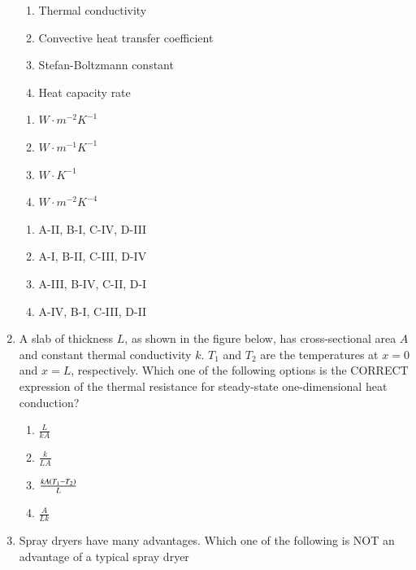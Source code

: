 \documentclass[journal,12pt,onecolumn]{IEEEtran}
\theoremstyle{remark}
\begin{document}
\begin{enumerate}
\hfill{}
\begin{multicols}{2}
    \begin{enumerate}[label = \Alph*]
        \item Thermal conductivity
        \item Convective heat transfer coefficient 
        \item Stefan-Boltzmann constant 
        \item Heat capacity rate 
    \end{enumerate}

\columnbreak

\begin{enumerate}[label = \Roman*]
    \item $W\cdot m^{-2}K^{-1}$
    \item $W\cdot m^{-1}K^{-1}$
    \item $W\cdot K^{-1}$
    \item $W\cdot m^{-2}K^{-4}$
\end{enumerate}
\end{multicols}

\begin{enumerate}
    \item A-II, B-I, C-IV, D-III
    \item A-I, B-II, C-III, D-IV
    \item A-III, B-IV, C-II, D-I
    \item A-IV, B-I, C-III, D-II
\end{enumerate}

    \item A slab of thickness $L$, as shown in the figure below, has cross-sectional area $A$ and constant thermal conductivity $k$. $T_1$ and $T_2$ are the temperatures at $x = 0$ and $x = L$, respectively. Which one of the following options is the CORRECT expression of the thermal resistance for steady-state one-dimensional heat conduction?

\hfill{}


\begin{enumerate}
    \item $\frac{L}{kA}$
    \item $\frac{k}{LA}$
    \item $\frac{kA\left(T_1 - T_2\right)}{L}$
    \item $\frac{A}{Lk}$
\end{enumerate}

    \item Spray dryers have many advantages. Which one of the following is NOT an advantage of a typical spray dryer


\end{enumerate}
\end{document}
